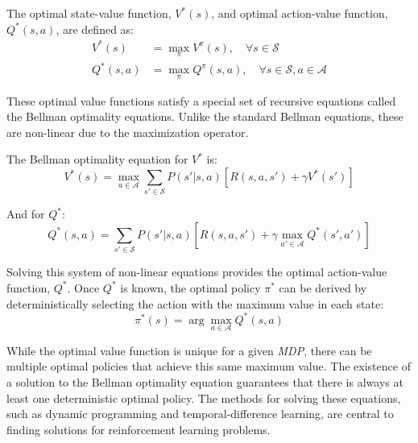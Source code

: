The optimal state-value function, $V^*(s)$, and optimal action-value function, $Q^*(s,a)$, are defined as:
\begin{align}
    V^*(s) &= \max_{\pi} V^\pi(s), \quad \forall s \in \mathcal{S} \\
    Q^*(s,a) &= \max_{\pi} Q^\pi(s,a), \quad \forall s \in \mathcal{S}, a \in \mathcal{A}
\end{align}

These optimal value functions satisfy a special set of recursive equations called the Bellman optimality equations. Unlike the standard Bellman equations, these are non-linear due to the maximization operator.

The Bellman optimality equation for $V^*$ is:
\begin{equation}
    V^*(s) = \max_{a \in \mathcal{A}} \sum_{s' \in \mathcal{S}} P(s'|s,a) [R(s,a,s') + \gamma V^*(s')]
\end{equation}

And for $Q^*$:
\begin{equation}
    Q^*(s,a) = \sum_{s' \in \mathcal{S}} P(s'|s,a) \left[ R(s,a,s') + \gamma \max_{a' \in \mathcal{A}} Q^*(s',a') \right]
\end{equation}

Solving this system of non-linear equations provides the optimal action-value function, $Q^*$. Once $Q^*$ is known, the optimal policy $\pi^*$ can be derived by deterministically selecting the action with the maximum value in each state:
\begin{equation}
    \pi^*(s) = \arg\max_{a \in \mathcal{A}} Q^*(s,a)
\end{equation}

While the optimal value function is unique for a given \textit{MDP}, there can be multiple optimal policies that achieve this same maximum value. The existence of a solution to the Bellman optimality equation guarantees that there is always at least one deterministic optimal policy. The methods for solving these equations, such as dynamic programming and temporal-difference learning, are central to finding solutions for reinforcement learning problems.

